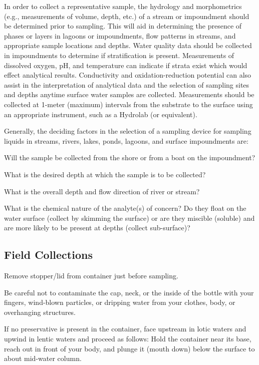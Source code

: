 \documentclass[12pt]{../SOP4_alpha}\usepackage[]{graphicx}\usepackage[]{xcolor}
\begin{document}
\NP In order to collect a representative sample, the hydrology and morphometrics (e.g.,
measurements of volume, depth, etc.) of a stream or impoundment should be determined prior to
sampling. This will aid in determining the presence of phases or layers in lagoons or
impoundments, flow patterns in streams, and appropriate sample locations and depths.
Water quality data should be collected in impoundments to determine if stratification is
present. Measurements of dissolved oxygen, pH, and temperature can indicate if strata exist
which would effect analytical results. Conductivity and oxidation-reduction potential can also
assist in the interpretation of analytical data and the selection of sampling sites and depths
anytime surface water samples are collected. Measurements should be collected at 1-meter
(maximum) intervals from the substrate to the surface using an appropriate instrument, such as a
Hydrolab (or equivalent).

Generally, the deciding factors in the selection of a sampling device for sampling liquids
in streams, rivers, lakes, ponds, lagoons, and surface impoundments are:

\begin{itemize*}
  \item Will the sample be collected from the shore or from a boat on the impoundment?
  \item What is the desired depth at which the sample is to be collected?
  \item What is the overall depth and flow direction of river or stream?
  \item What is the chemical nature of the analyte(s) of concern? Do they float on the water surface (collect by skimming the surface) or are they miscible (soluble) and are more likely to be present at depths (collect sub-surface)? 
\end{itemize*}

\subsection{Field Collections}

\NP Remove stopper/lid from container just before sampling. 

\NP Be careful not to contaminate the cap, neck, or the inside of the bottle with your fingers, wind-blown particles, or dripping water from your clothes, body, or overhanging structures.  

\NP If no preservative is present in the container, face upstream in lotic waters and upwind in lentic waters and proceed as follows:  Hold the container near its base, reach out in front of your body, and plunge it (mouth down) below the surface to about mid-water column. 
\end{document}

